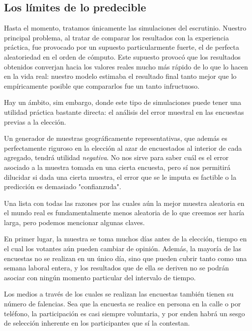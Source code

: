 \documentclass[12pt, a4paper]{article}
\begin{document}
\subsection{Los l\'imites de lo predecible}

Hasta el momento, tratamos \'unicamente las simulaciones del escrutinio. Nuestro principal problema, al tratar de comparar los resultados con la experiencia pr\'actica, fue provocado por un supuesto particularmente fuerte, el de perfecta aleatoriedad en el orden de c\'omputo. Este supuesto provoc\'o que los resultados obtenidos converjan hacia los valores reales mucho m\'as r\'apido de lo que lo hacen en la vida real: nuestro modelo estimaba el resultado final tanto mejor que lo emp\'iricamente posible que compararlos fue un tanto infructuoso.

Hay un \'ambito, sim embargo, donde este tipo de simulaciones puede tener una utilidad pr\'actica bastante directa: el an\'alisis del error muestral en las encuestas previas a la elecci\'on.

Un generador de muestras geogr\'aficamente representativas, que adem\'as es perfectamente riguroso en la elecci\'on al azar de encuestados al interior de cada agregado, tendr\'a utilidad \emph{negativa}. No nos sirve para saber cu\'al es el error asociado a la muestra tomada en una cierta encuesta, pero s\'i nos permitir\'a dilucidar si dada una cierta muestra, el error que se le imputa es factible o la predicci\'on es demasiado "confianzuda".

Una lista con todas las razones por las cuales a\'un la mejor muestra aleatoria en el mundo real es fundamentalmente menos aleatoria de lo que creemos ser har\'ia larga, pero podemos mencionar algunas claves.

En primer lugar, la muestra se toma muchos d\'ias antes de la elecci\'on, tiempo en el cual los votantes a\'un pueden cambiar de opini\'on. Adem\'as, la mayor\'ia de las encuestas no se realizan en un \'unico d\'ia, sino que pueden cubrir tanto como una semana laboral entera, y los resultados que de ella se deriven no se podr\'an asociar con ning\'un momento particular del intervalo de tiempo.

Los medios a trav\'es de los cuales se realizan las encuestas tambi\'en tienen su n\'umero de falencias. Sea que la encuesta se realice en persona en la calle o por tel\'efono, la participaci\'on es casi siempre voluntaria, y por enden habr\'a un sesgo de selecci\'on inherente en los participantes que s\'i la contestan.
\end{document}
